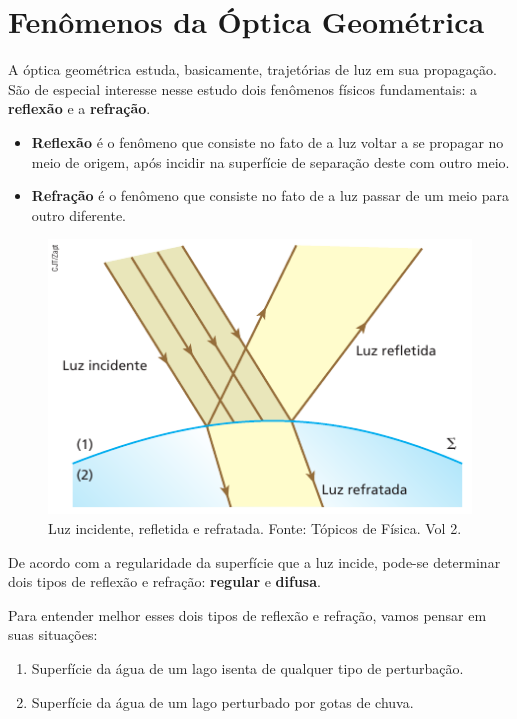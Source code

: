 \documentclass[11pt,twocolumn,oneside]{article}
\begin{document}
\hypertarget{x-fenômenos-da-óptica-geométrica}{\section{Fenômenos da Óptica Geométrica}}
A óptica geométrica estuda, basicamente, trajetórias de luz em sua propagação. São de especial interesse nesse estudo dois fenômenos físicos fundamentais: a \textbf{reflexão} e a \textbf{refração}.


\begin{itemize}

\item \textbf{Reflexão} é o fenômeno que consiste no fato de a luz voltar a se propagar no meio de origem, após incidir na superfície de separação deste com outro meio.

\item \textbf{Refração} é o fenômeno que consiste no fato de a luz passar de um meio para outro diferente.

\end{itemize}


\begin{figure}[h]{}
\centering\includegraphics[width=2.5truein]{img7.png}
\caption{Luz incidente, refletida e refratada. Fonte: Tópicos de Física. Vol 2.}
\centering
\end{figure}

De acordo com a regularidade da superfície que a luz incide, pode-se determinar dois tipos de reflexão e refração: \textbf{regular} e \textbf{difusa}.


Para entender melhor esses dois tipos de reflexão e refração, vamos pensar em suas situações:


\begin{enumerate}

\item{Superfície da água de um lago isenta de qualquer tipo de perturbação.}

\item{Superfície da água de um lago perturbado por gotas de chuva.}

\end{enumerate}
\end{document}
